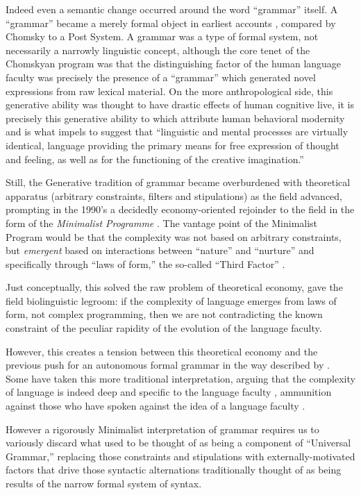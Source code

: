 \documentclass{article}
\begin{document}
Indeed even a semantic change occurred around the word ``grammar'' itself.
A ``grammar'' became a merely formal object in earliest accounts \parencite{chomsky53, chomsky57, chomsky65}, compared by Chomsky to a Post System.
A grammar was a type of formal system, not necessarily a narrowly linguistic concept, although the core tenet of the Chomskyan program was that the distinguishing factor of the human language faculty was precisely the presence of a ``grammar'' which generated novel expressions from raw lexical material.
On the more anthropological side, this generative ability was thought to have drastic effects of human cognitive live, it is precisely this generative ability to which \textcite{berwick15} attribute human behavioral modernity and is what impels \textcite{chomsky66} to suggest that ``linguistic and mental processes are virtually identical, language providing the primary means for free expression of thought and feeling, as well as for the functioning of the creative imagination.''

Still, the Generative tradition of grammar became overburdened with theoretical apparatus (arbitrary constraints, filters and stipulations) as the field advanced, prompting in the 1990's a decidedly economy-oriented rejoinder to the field in the form of the \textit{Minimalist Programme} \parencite{chomsky95}.
The vantage point of the Minimalist Program would be that the complexity was not based on arbitrary constraints, but \emph{emergent} based on interactions between ``nature'' and ``nurture'' and specifically through ``laws of form,'' the so-called ``Third Factor'' \parencite{chomsky05}.

Just conceptually, this solved the raw problem of theoretical economy, gave the field biolinguistic legroom: if the complexity of language emerges from laws of form, not complex programming, then we are not contradicting the known constraint of the peculiar rapidity of the evolution of the language faculty.

However, this creates a tension between this theoretical economy and the previous push for an autonomous formal grammar in the way described by \textcite{chomsky65}.
Some have taken this more traditional interpretation, arguing that the complexity of language is indeed deep and specific to the language faculty \parencite{cinque12} , ammunition against those who have spoken against the idea of a language faculty \parencite{evans09}. 

However a rigorously Minimalist interpretation of grammar requires us to variously discard what used to be thought of as being a component of ``Universal Grammar,'' replacing those constraints and stipulations with externally-motivated factors that drive those syntactic alternations traditionally thought of as being results of the narrow formal system of syntax.
\end{document}
